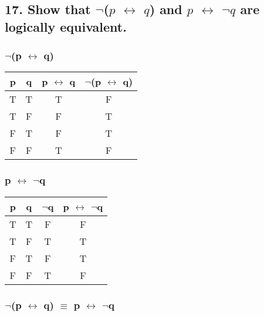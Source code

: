 \documentclass[11pt, oneside]{article} %
\numberwithin{equation}{section} %
\numberwithin{figure}{section} %
\numberwithin{table}{section} %
\begin{document}
\begin{table}[!htbp]
\subsection{17. Show that $\neg$($p$ $\leftrightarrow$ $q$) and $p$ $\leftrightarrow$ $\neg$$q$ are logically equivalent.}
\subsubsection{$\neg$(p $\leftrightarrow$ q)}
\begin{tabular}{c c c c}
\hline\hline
p & q & p $\leftrightarrow$ q & $\neg$(p $\leftrightarrow$ q) \\ [0.5ex] 
\hline
T & T & T & F\\
T & F & F & T\\
F & T & F & T\\
F & F & T & F\\ [1ex]
\hline
\end{tabular}
\label{table:nonlin}
\end{table}

\begin{table}[!htbp]
\subsubsection{p $\leftrightarrow$ $\neg$q}
\begin{tabular}{c c c c}
\hline\hline
p & q & $\neg$q & p $\leftrightarrow$ $\neg$q \\ [0.5ex] 
\hline
T & T & F & F\\
T & F & T & T\\
F & T & F & T\\
F & F & T & F\\ [1ex]
\hline
\end{tabular}
\label{table:nonlin}
\subsubsection{$\neg$(p $\leftrightarrow$ q) $\equiv$ p $\leftrightarrow$ $\neg$q}
\end{table}
\end{document}
